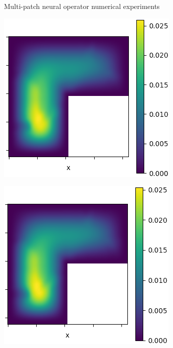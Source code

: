 \documentclass{beamer}
\begin{document}
\begin{frame}{Multi-patch neural operator numerical experiments}
\begin{center}
\begin{minipage}{0.24\textwidth}
			\includegraphics[width=\textwidth]{MPNO_output.png}
		\end{minipage}
		\hfill
		\begin{minipage}{0.24\textwidth}
			\includegraphics[width=\textwidth]{MPNO_appro.png}
		\end{minipage}

\end{center}
\end{frame}
\end{document}
